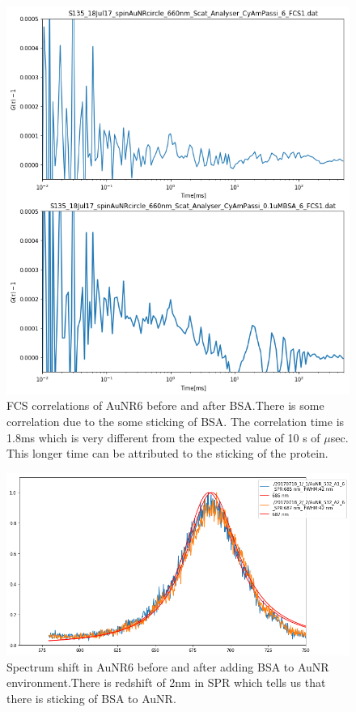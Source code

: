 \documentclass[twoside,single]{lion-msc}
\begin{document}
\begin{figure}[H]
\includegraphics[width=.6\textwidth,center]{12}
\begin{center}
\caption {FCS correlations of AuNR6 before and after BSA.There is some correlation due to the some sticking of BSA. The correlation time is 1.8ms which is very different from the expected value of 10 s of $\mu$sec. This longer time can be attributed to the sticking of the protein.}
\end{center}
\end{figure}

\begin{figure}[H]
\includegraphics[width=.6\textwidth,center]{7}
\begin{center}
\caption {Spectrum shift in AuNR6 before and after adding BSA to AuNR environment.There is redshift of 2nm in SPR which tells us that there is sticking of BSA to AuNR.}
\end{center}
\end{figure}
\end{document}
